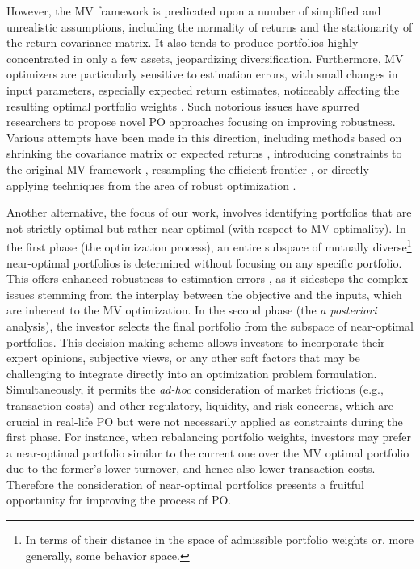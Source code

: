 However, the MV framework is predicated upon a number of simplified and unrealistic assumptions, including the normality of returns and the stationarity of the return covariance matrix. It also tends to produce portfolios highly concentrated in only a few assets, jeopardizing diversification. Furthermore, MV optimizers are particularly sensitive to estimation errors, with small changes in input parameters, especially expected return estimates, noticeably affecting the resulting optimal portfolio weights \cite{best}. Such notorious issues have spurred researchers to propose novel PO approaches focusing on improving robustness. Various attempts have been made in this direction, including methods based on shrinking the covariance matrix \cite{ledoit} or expected returns \cite{black}, introducing constraints to the original MV framework \cite{demiguel}, resampling the efficient frontier \cite{michaud}, or directly applying techniques from the area of robust optimization \cite{yin}. 

Another alternative, the focus of our work, involves identifying portfolios that are not strictly optimal but rather near-optimal (with respect to MV optimality). In the first phase (the optimization process), an entire subspace of mutually diverse\footnote{In terms of their distance in the space of admissible portfolio weights or, more generally, some behavior space.} near-optimal portfolios is determined without focusing on any specific portfolio. This offers enhanced robustness to estimation errors \cite{degraaf}, as it sidesteps the complex issues stemming from the interplay between the objective and the inputs, which are inherent to the MV optimization. In the second phase (the \textit{a posteriori} analysis), the investor selects the final portfolio from the subspace of near-optimal portfolios. This decision-making scheme allows investors to incorporate their expert opinions, subjective views, or any other soft factors that may be challenging to integrate directly into an optimization problem formulation. Simultaneously, it permits the \emph{ad-hoc} consideration of market frictions (e.g., transaction costs) and other regulatory, liquidity, and risk concerns, which are crucial in real-life PO but were not necessarily applied as constraints during the first phase. For instance, when rebalancing portfolio weights, investors may prefer a near-optimal portfolio similar to the current one over the MV optimal portfolio due to the former's lower turnover, and hence also lower transaction costs. Therefore the consideration of near-optimal portfolios presents a fruitful opportunity for improving the process of PO.


